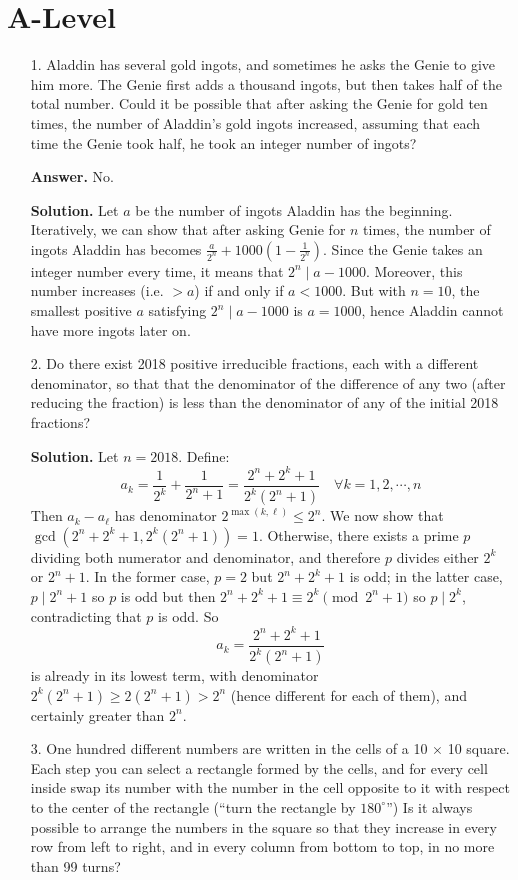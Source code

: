 \documentclass[11pt,a4paper]{article}
\begin{document}
\section*{A-Level}
\begin{enumerate}
	\item[1.]
	Aladdin has several gold ingots, and sometimes he asks the Genie to give him more. The Genie
	first adds a thousand ingots, but then takes half of the total number. Could it be possible
	that after asking the Genie for gold ten times, the number of Aladdin’s gold ingots increased,
	assuming that each time the Genie took half, he took an integer number of ingots?
	
	\textbf{Answer.} No. 
	
	\textbf{Solution.} Let $a$ be the number of ingots Aladdin has the beginning. 
	Iteratively, we can show that after asking Genie for $n$ times, 
	the number of ingots Aladdin has becomes $\frac{a}{2^n}+1000(1-\frac{1}{2^n})$. 
	Since the Genie takes an integer number every time, 
	it means that $2^n\mid a-1000$. 
	Moreover, this number increases (i.e. $>a$) if and only if $a < 1000$. 
	But with $n=10$, the smallest positive $a$ satisfying $2^n\mid a-1000$ is $a=1000$, hence Aladdin cannot have more ingots later on. 
	
	\item[2.] Do there exist 2018 positive irreducible fractions, each with a different denominator, so that that the denominator of the difference of any two (after reducing the fraction) is less than the denominator of any of the initial 2018 fractions?
	
	\textbf{Solution.} Let $n=2018$. Define: 
	\[
	a_k = \frac{1}{2^k} + \frac{1}{2^{n}+1} = \frac{2^n+2^k+1}{2^k(2^n+1)}\quad \forall k = 1, 2, \cdots , n
	\]
	Then $a_k-a_{\ell}$ has denominator $2^{\max(k, \ell)}\le 2^n$. We now show that $\gcd(2^n+2^k+1, 2^k(2^n+1))=1$. Otherwise, there exists a prime $p$ dividing both numerator and denominator, and therefore $p$ divides either $2^k$ or $2^n+1$. In the former case, $p=2$ but $2^n+2^k+1$ is odd; in the latter case, $p\mid 2^n+1$ so $p$ is odd but then $2^n+2^k+1\equiv 2^k\pmod{2^n+1}$ so $p\mid 2^k$, contradicting that $p$ is odd. So 
	\[
	a_k = \frac{2^n+2^k+1}{2^k(2^n+1)}
	\]
	is already in its lowest term, with denominator $2^k(2^n+1)\ge 2(2^n+1)>2^n$ (hence different for each of them), and certainly greater than $2^n$. 
	
	\item[3.] One hundred different numbers are written in the cells of a 10 $\times$ 10 square. Each step you can
	select a rectangle formed by the cells, and for every cell inside swap its number with the number
	in the cell opposite to it with respect to the center of the rectangle (``turn the rectangle by $180^{\circ}$'')
	Is it always possible to arrange the numbers in the square so that they increase in every row
	from left to right, and in every column from bottom to top, in no more than 99 turns?
	

\end{enumerate}
\end{document}
